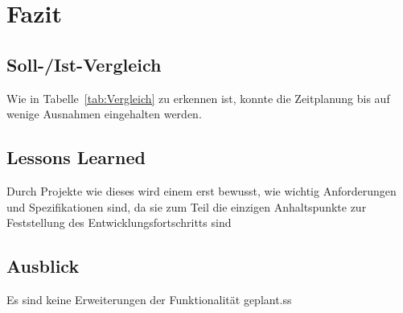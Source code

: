 \section{Fazit} 
\label{sec:Fazit}

\subsection{Soll-/Ist-Vergleich}
\label{sec:SollIstVergleich}

Wie in Tabelle~\ref{tab:Vergleich} zu erkennen ist, konnte die Zeitplanung bis auf wenige Ausnahmen eingehalten werden.


\subsection{Lessons Learned}
\label{sec:LessonsLearned}

Durch Projekte wie dieses wird einem erst bewusst, wie wichtig Anforderungen und Spezifikationen sind, da sie zum Teil die einzigen Anhaltspunkte zur Feststellung des Entwicklungsfortschritts sind

\subsection{Ausblick}
\label{sec:Ausblick}

Es sind keine Erweiterungen der Funktionalität geplant.ss

